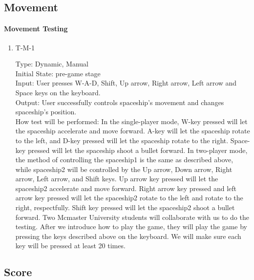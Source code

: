 \documentclass[12pt, titlepage]{article}
\begin{document}
\subsection{Movement}
		
\paragraph{Movement Testing}

\begin{enumerate}

\item{T-M-1\\}

Type: Dynamic, Manual\\		
	
Initial State: pre-game stage\\

Input:  User presses W-A-D, Shift, Up arrow, Right arrow, Left arrow and Space keys on the keyboard.\\
					
Output: User successfully controls spaceship’s movement and changes spaceship's position.\\
					
How test will be performed:  In the single-player mode, W-key pressed will let the spaceship accelerate and move forward. A-key will let the spaceship rotate to the left, and D-key pressed will let the spaceship rotate to the right. Space-key pressed will let the spaceship shoot a bullet forward. In two-player mode, the method of controlling the spaceship1 is the same as described above, while spaceship2 will be controlled by the Up arrow, Down arrow, Right arrow, Left arrow, and Shift keys. Up arrow key pressed will let the spaceship2 accelerate and move forward. Right arrow key pressed and left arrow key pressed will let the spaceship2 rotate to the left and rotate to the right, respectfully. Shift key pressed will let the spaceship2 shoot a bullet forward. Two Mcmaster University students will collaborate with us to do the testing. After we introduce how to play the game, they will play the game by pressing the keys described above on the keyboard. We will make sure each key will be pressed at least 20 times. \\

\end{enumerate}

\subsection{Score}
\end{document}
